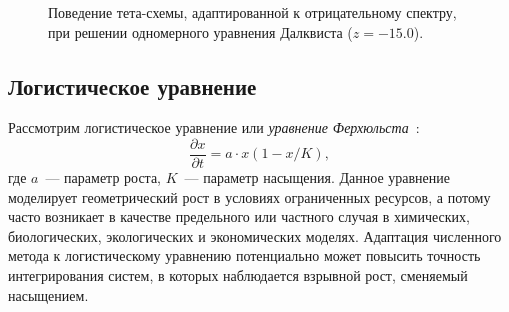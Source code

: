 \begin{figure}
    \centering
    \small
    \caption{Поведение тета-схемы, адаптированной к отрицательному спектру, при решении одномерного уравнения Далквиста ($ z = -15.0 $).}
    \label{fig:one_dimensional_linear_system:Dahlquist_optimal_theta_method_2}
\end{figure}

\FloatBarrier


\subsection{Логистическое уравнение}
\label{subsection:methods:logistic_differential_equation}

Рассмотрим логистическое уравнение или \emph{уравнение Ферхюльста}~\cite{verhulst1838logistic_equation, cramer2002origins_of_logistic_regression}:
\begin{equation}
    \label{eq:logistic_differential_equation:logistic_differential_equation}
    \frac{\partial x}{\partial t} = a \cdot x (1 - x / K),
\end{equation}
где $ a $~--- параметр роста, $ K $~--- параметр насыщения.
Данное уравнение моделирует геометрический рост в условиях ограниченных ресурсов,
а потому часто возникает в качестве предельного или частного случая в химических,
биологических, экологических и экономических моделях.
Адаптация численного метода к логистическому уравнению потенциально может повысить точность интегрирования систем,
в которых наблюдается взрывной рост, сменяемый насыщением.

